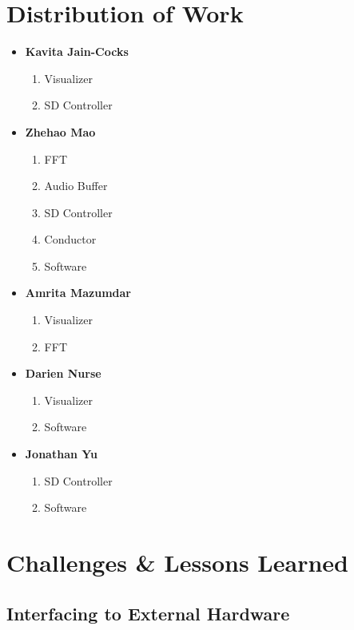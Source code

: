 \documentclass{article}
\begin{document}
\section{Distribution of Work}
\begin{itemize}

\item
	\textbf{Kavita Jain-Cocks}
	\begin{enumerate}
		\item Visualizer
		\item SD Controller
	\end{enumerate}

\item 
	\textbf{Zhehao Mao}
	\begin{enumerate}
		\item FFT
		\item Audio Buffer
		\item SD Controller
		\item Conductor
		\item Software
	\end{enumerate}

\item 
	\textbf{Amrita Mazumdar}
	\begin{enumerate}
		\item Visualizer
		\item FFT
	\end{enumerate}

\item 
	\textbf{Darien Nurse}
	\begin{enumerate}
		\item Visualizer
		\item Software
	\end{enumerate}

\item 
	\textbf{Jonathan Yu}
	\begin{enumerate}
		\item SD Controller
		\item Software
	\end{enumerate}

\end{itemize}

\section{Challenges \& Lessons Learned}

\subsection{Interfacing to External Hardware}
\end{document}
